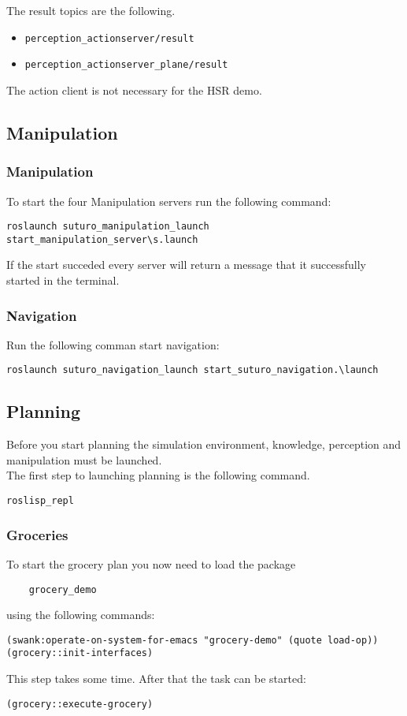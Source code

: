 \documentclass[main.tex]{subfiles}
\begin{document}
The result topics are the following.
\begin{itemize}
\item \begin{verbatim}
perception_actionserver/result
\end{verbatim}
\item \begin{verbatim}
perception_actionserver_plane/result
\end{verbatim}
\end{itemize}

The action client is not necessary for the HSR demo.
	
	\subsection{Manipulation}
	\subsubsection{Manipulation}
	To start the four Manipulation servers run the following command:
	\begin{lstlisting}
roslaunch suturo_manipulation_launch start_manipulation_server\s.launch
\end{lstlisting}
	If the start succeded every server will return a message that it successfully started in the terminal.	
	
	\subsubsection{Navigation}
	Run the following comman start navigation:
	\begin{lstlisting}
roslaunch suturo_navigation_launch start_suturo_navigation.\launch
\end{lstlisting}
	
	\subsection{Planning}
	Before you start planning the simulation environment, knowledge, perception and manipulation must be launched.\\
	The first step to launching planning is the following command.
	\begin{lstlisting}
roslisp_repl
\end{lstlisting}
	\subsubsection{Groceries}
	To start the grocery plan you now need to load the package \begin{verbatim}
	grocery_demo
	\end{verbatim}
	 using the following commands:
	\begin{lstlisting}
(swank:operate-on-system-for-emacs "grocery-demo" (quote load-op))
(grocery::init-interfaces)
\end{lstlisting}
This step takes some time. After that the task can be started:
\begin{lstlisting}
(grocery::execute-grocery)
\end{lstlisting}
\end{document}
